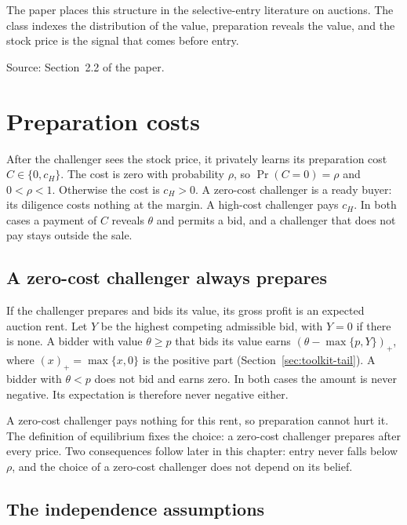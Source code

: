 The paper places this structure in the selective-entry literature on auctions.
The class indexes the distribution of the value, preparation reveals the value, and the stock price is the signal that comes before entry.

{\small\color{notegrey}Source: Section~2.2 of the paper.}

\section{Preparation costs}\label{sec:model-costs}

After the challenger sees the stock price, it privately learns its preparation cost \(C\in\{0,c_H\}\).
The cost is zero with probability \(\rho\), so \(\Pr(C=0)=\rho\) and \(0<\rho<1\). Otherwise the cost is \(c_H>0\).
A zero-cost challenger is a ready buyer: its diligence costs nothing at the margin.
A high-cost challenger pays \(c_H\).
In both cases a payment of \(C\) reveals \(\theta\) and permits a bid, and a challenger that does not pay stays outside the sale.

\subsection*{A zero-cost challenger always prepares}

If the challenger prepares and bids its value, its gross profit is an expected auction rent.
Let \(Y\) be the highest competing admissible bid, with \(Y=0\) if there is none.
A bidder with value \(\theta\ge p\) that bids its value earns \((\theta-\max\{p,Y\})_+\), where \((x)_+=\max\{x,0\}\) is the positive part (Section~\ref{sec:toolkit-tail}).
A bidder with \(\theta<p\) does not bid and earns zero. In both cases the amount is never negative.
Its expectation is therefore never negative either.

A zero-cost challenger pays nothing for this rent, so preparation cannot hurt it.
The definition of equilibrium fixes the choice: a zero-cost challenger prepares after every price.
Two consequences follow later in this chapter: entry never falls below \(\rho\), and the choice of a zero-cost challenger does not depend on its belief.

\subsection*{The independence assumptions}

